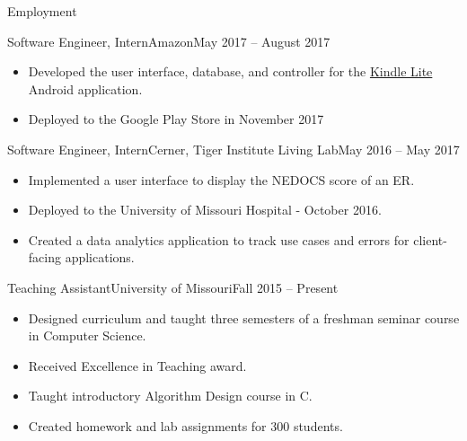\documentclass[]{mcdowellcv}
\begin{document}
    \begin{cvsection}{Employment}
        \begin{cvsubsection}{Software Engineer, Intern}{Amazon}{May 2017 -- August 2017}
            \begin{itemize}
            \item Developed the user interface, database, and controller for the \href{https://play.google.com/store/apps/details?id=com.amazon.klite&hl=en}{Kindle Lite} Android application.
            \item Deployed to the Google Play Store in November 2017
            \end{itemize}
        \end{cvsubsection}

        \begin{cvsubsection}{Software Engineer, Intern}{Cerner, Tiger Institute Living Lab}{May 2016 -- May 2017}		
            \begin{itemize}
                \item Implemented a user interface to display the NEDOCS score of an ER.
                \item Deployed to the University of Missouri Hospital - October 2016.
                \item Created a data analytics application to track use cases and errors for client-facing applications.
            \end{itemize}
        \end{cvsubsection}

        \begin{cvsubsection}{Teaching Assistant}{University of Missouri}{Fall 2015 -- Present}
            \begin{itemize}
                \item Designed curriculum and taught three semesters of a freshman seminar course in Computer Science.
                \item Received Excellence in Teaching award.
                 \item Taught introductory Algorithm Design course in C.
                \item Created homework and lab assignments for 300 students.
            \end{itemize}
        \end{cvsubsection}

    \end{cvsection}	
    
\end{document}
